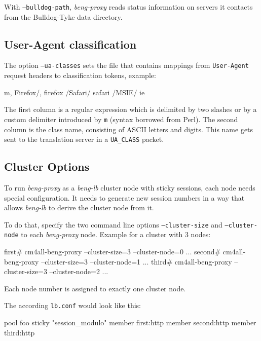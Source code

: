 \documentclass[a4paper,12pt]{article}
\begin{document}
\label{bulldog}
With \texttt{--bulldog-path}, \emph{beng-proxy} reads status
information on servers it contacts from the Bulldog-Tyke data
directory.

\subsection{User-Agent classification}
\label{uaclass}

The option \texttt{--ua-classes} sets the file that contains mappings
from \texttt{User-Agent} request headers to classification tokens,
example:

\begin{verbatim*}
m, Firefox/, firefox
/Safari/ safari
/MSIE/ ie
\end{verbatim*}

The first column is a regular expression which is delimited by two
slashes or by a custom delimiter introduced by \texttt{m} (syntax
borrowed from Perl).  The second column is the class name, consisting
of ASCII letters and digits.  This name gets sent to the translation
server in a \verb|UA_CLASS| packet.

\subsection{Cluster Options}

To run \emph{beng-proxy} as a \emph{beng-lb} cluster node with sticky
sessions, each node needs special configuration.  It needs to generate
new session numbers in a way that allows \emph{beng-lb} to derive the
cluster node from it.

To do that, specify the two command line options
\texttt{--cluster-size} and \texttt{--cluster-node} to each
\emph{beng-proxy} node.  Example for a cluster with 3 nodes:

\begin{verbatim*}
first# cm4all-beng-proxy --cluster-size=3 --cluster-node=0 ...
second# cm4all-beng-proxy --cluster-size=3 --cluster-node=1 ...
third# cm4all-beng-proxy --cluster-size=3 --cluster-node=2 ...
\end{verbatim*}

Each node number is assigned to exactly one cluster node.

The according \texttt{lb.conf} would look like this:

\begin{verbatim*}
pool foo {
  sticky "session_modulo"
  member first:http
  member second:http
  member third:http
}
\end{verbatim*}
\end{document}
